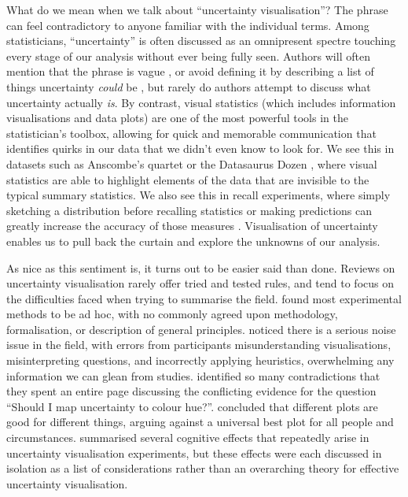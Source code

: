 \documentclass[]{ar-1col-S2O}
\begin{document}
What do we mean when we talk about ``uncertainty visualisation''? The
phrase can feel contradictory to anyone familiar with the individual
terms. Among statisticians, ``uncertainty'' is often discussed as an
omnipresent spectre touching every stage of our analysis without ever
being fully seen. Authors will often mention that the phrase is vague
\citep{Spiegelhalter2017, Griethe2006}, or avoid defining it by
describing a list of things uncertainty \emph{could} be
\citep{Kinkeldey2014, Hullman2016}, but rarely do authors attempt to
discuss what uncertainty actually \emph{is}. By contrast, visual
statistics (which includes information visualisations and data plots)
are one of the most powerful tools in the statistician's toolbox,
allowing for quick and memorable communication that identifies quirks in
our data that we didn't even know to look for. We see this in datasets
such as Anscombe's quartet \citep{anscombe} or the Datasaurus Dozen
\citep{datasaurus, datasaurpkg}, where visual statistics are able to
highlight elements of the data that are invisible to the typical summary
statistics. We also see this in recall experiments, where simply
sketching a distribution before recalling statistics or making
predictions can greatly increase the accuracy of those measures
\citep{Hullman2018, Goldstein2014}. Visualisation of uncertainty enables
us to pull back the curtain and explore the unknowns of our analysis.

As nice as this sentiment is, it turns out to be easier said than done.
Reviews on uncertainty visualisation rarely offer tried and tested
rules, and tend to focus on the difficulties faced when trying to
summarise the field. \citet{Kinkeldey2014} found most experimental
methods to be ad hoc, with no commonly agreed upon methodology,
formalisation, or description of general principles. \citet{Hullman2016}
noticed there is a serious noise issue in the field, with errors from
participants misunderstanding visualisations, misinterpreting questions,
and incorrectly applying heuristics, overwhelming any information we can
glean from studies. \citet{MacEachren2005} identified so many
contradictions that they spent an entire page discussing the conflicting
evidence for the question ``Should I map uncertainty to colour hue?''.
\citet{Spiegelhalter2017} concluded that different plots are good for
different things, arguing against a universal best plot for all people
and circumstances. \citet{uncertchap2022} summarised several cognitive
effects that repeatedly arise in uncertainty visualisation experiments,
but these effects were each discussed in isolation as a list of
considerations rather than an overarching theory for effective
uncertainty visualisation.
\end{document}
